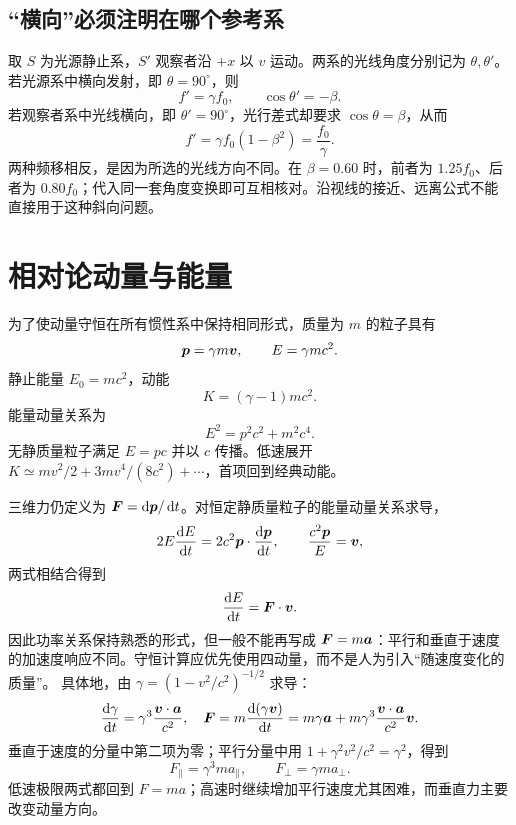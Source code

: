 

\subsection{“横向”必须注明在哪个参考系}
取 $S$ 为光源静止系，$S'$ 观察者沿 $+x$ 以 $v$ 运动。两系的光线角度分别记为 $\theta,\theta'$。若光源系中横向发射，即 $\theta=90^\circ$，则
\[
 f'=\gamma f_0,\qquad \cos\theta'=-\beta.
\]
若观察者系中光线横向，即 $\theta'=90^\circ$，光行差式却要求 $\cos\theta=\beta$，从而
\[
 f'=\gamma f_0(1-\beta^2)=\frac{f_0}{\gamma}.
\]
两种频移相反，是因为所选的光线方向不同。在 $\beta=0.60$ 时，前者为 $1.25f_0$、后者为 $0.80f_0$；代入同一套角度变换即可互相核对。沿视线的接近、远离公式不能直接用于这种斜向问题。

\section{相对论动量与能量}

为了使动量守恒在所有惯性系中保持相同形式，质量为 $m$ 的粒子具有
\begin{equation}
 \bm{p}=\gamma m\bm{v},
 \qquad E=\gamma mc^2.
\end{equation}
静止能量 $E_0=mc^2$，动能
\begin{equation}
 K=(\gamma-1)mc^2.
\end{equation}
能量动量关系为
\begin{equation}
 E^2=p^2c^2+m^2c^4.
\end{equation}
无静质量粒子满足 $E=pc$ 并以 $c$ 传播。低速展开
$K\simeq mv^2/2+3mv^4/(8c^2)+\cdots$，首项回到经典动能。

三维力仍定义为 $\bm{F}=\mathop{}\!\mathrm d\bm{p}/\mathop{}\!\mathrm d t$。对恒定静质量粒子的能量动量关系求导，
\[
 2E\frac{\mathop{}\!\mathrm d E}{\mathop{}\!\mathrm d t}=2c^2\bm{p}\cdot\frac{\mathop{}\!\mathrm d\bm{p}}{\mathop{}\!\mathrm d t},
 \qquad \frac{c^2\bm{p}}{E}=\bm{v},
\]
两式相结合得到
\begin{equation}
 \frac{\mathop{}\!\mathrm d E}{\mathop{}\!\mathrm d t}=\bm{F}\cdot\bm{v}.
\end{equation}
因此功率关系保持熟悉的形式，但一般不能再写成 $\bm{F}=m\bm{a}$：平行和垂直于速度的加速度响应不同。守恒计算应优先使用四动量，而不是人为引入“随速度变化的质量”。
具体地，由 $\gamma=(1-v^2/c^2)^{-1/2}$ 求导：
\[
 \frac{\mathop{}\!\mathrm d\gamma}{\mathop{}\!\mathrm d t}=\gamma^3\frac{\bm{v}\cdot\bm{a}}{c^2},
 \quad \bm{F}=m\frac{\mathop{}\!\mathrm d(\gamma\bm{v})}{\mathop{}\!\mathrm d t}
 =m\gamma\bm{a}+m\gamma^3\frac{\bm{v}\cdot\bm{a}}{c^2}\bm{v}.
\]
垂直于速度的分量中第二项为零；平行分量中用 $1+\gamma^2v^2/c^2=\gamma^2$，得到
\begin{equation}
 F_{\parallel}=\gamma^3ma_{\parallel},
 \qquad
 F_{\perp}=\gamma ma_{\perp}.
\end{equation}
低速极限两式都回到 $F=ma$；高速时继续增加平行速度尤其困难，而垂直力主要改变动量方向。

